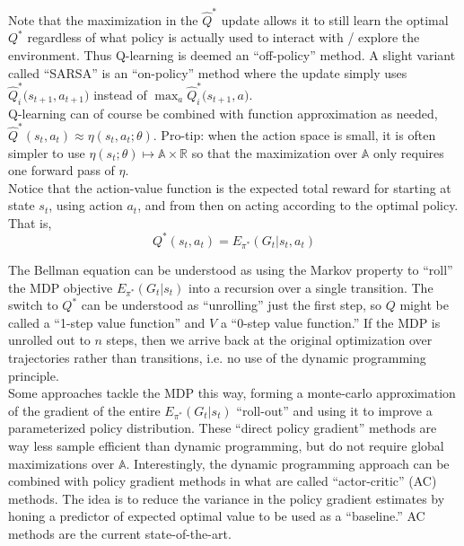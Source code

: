 Note that the maximization in the $\hat{Q}^*$ update allows it to still learn the optimal $Q^*$ regardless of what policy is actually used to interact with / explore the environment. Thus Q-learning is deemed an ``off-policy'' method. A slight variant called ``SARSA'' is an ``on-policy'' method where the update simply uses $\hat{Q}^*_i{(}s_{t+1}, a_{t+1}{)}$ instead of $\max_{a} \hat{Q}^*_i{(}s_{t+1}, a{)}$.\\

Q-learning can of course be combined with function approximation as needed, $\hat{Q}^*(s_t,a_t) \approx \eta(s_t,a_t;\theta)$. Pro-tip: when the action space is small, it is often simpler to use $\eta(s_t;\theta) \mapsto \mathbb{A} \times \mathbb{R}$ so that the maximization over $\mathbb{A}$ only requires one forward pass of $\eta$.\\

Notice that the action-value function is the expected total reward for starting at state $s_t$, using action $a_t$, and from then on acting according to the optimal policy. That is,
\begin{equation*}
Q^*(s_t, a_t) = E_{\pi^*}(G_t | s_t, a_t)
\end{equation*}

The Bellman equation can be understood as using the Markov property to ``roll'' the MDP objective $E_{\pi^*}(G_t | s_t)$ into a recursion over a single transition. The switch to $Q^*$ can be understood as ``unrolling'' just the first step, so $Q$ might be called a ``1-step value function'' and $V$ a ``0-step value function.'' If the MDP is unrolled out to $n$ steps, then we arrive back at the original optimization over trajectories rather than transitions, i.e. no use of the dynamic programming principle.\\

Some approaches tackle the MDP this way, forming a monte-carlo approximation of the gradient of the entire $E_{\pi^*}(G_t | s_t)$ ``roll-out'' and using it to improve a parameterized policy distribution. These ``direct policy gradient'' methods are way less sample efficient than dynamic programming, but do not require global maximizations over $\mathbb{A}$. Interestingly, the dynamic programming approach can be combined with policy gradient methods in what are called ``actor-critic'' (AC) methods. The idea is to reduce the variance in the policy gradient estimates by honing a predictor of expected optimal value to be used as a ``baseline.'' AC methods are the current state-of-the-art.\\

